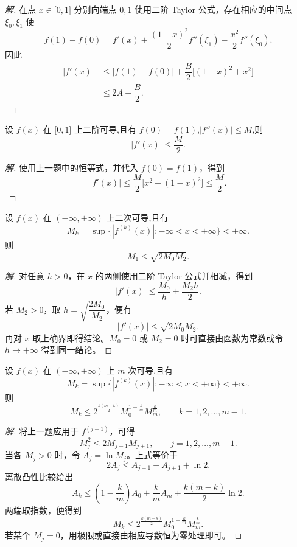 \documentclass[../../数学分析培优讲义(答案版).tex]{subfiles}
\begin{document}
\begin{proof}[解]
在点 $x\in\lbrack0,1\rbrack$ 分别向端点 $0,1$ 使用二阶 Taylor 公式，存在相应的中间点 $\xi_0,\xi_1$ 使
\[
    f(1)-f(0)
    =f'(x)+\dfrac{(1-x)^2}{2}f''(\xi_1)
    -\dfrac{x^2}{2}f''(\xi_0).
\]
因此
\[
\begin{aligned}
    |f'(x)|
    &\leq |f(1)-f(0)|
    +\dfrac{B}{2}\bigl[(1-x)^2+x^2\bigr]\\
    &\leq2A+\dfrac{B}{2}.
\end{aligned}
\]
\end{proof}

\begin{example}
设 $f(x)$ 在 $\lbrack 0,1\rbrack$ 上二阶可导,且有 $f(0)=f(1)$,$|f''(x)|\leq M$,则
\[
    |f'(x)|\leq\dfrac{M}{2}.
\]
\end{example}

\begin{proof}[解]
使用上一题中的恒等式，并代入 $f(0)=f(1)$，得到
\[
    |f'(x)|
    \leq\dfrac{M}{2}\bigl[x^2+(1-x)^2\bigr]
    \leq\dfrac{M}{2}.
\]
\end{proof}

\begin{example}[\markstar]
设 $f(x)$ 在 $(-\infty,+\infty)$ 上二次可导,且有
\[
    M_k=\sup\{|f^{(k)}(x)|:-\infty<x<+\infty\}<+\infty.
\]
则
\[
    M_1\leq\sqrt{2M_0M_2}.
\]
\end{example}

\begin{proof}[解]
对任意 $h>0$，在 $x$ 的两侧使用二阶 Taylor 公式并相减，得到
\[
    |f'(x)|\leq\dfrac{M_0}{h}+\dfrac{M_2h}{2}.
\]
若 $M_2>0$，取 $h=\sqrt{\dfrac{2M_0}{M_2}}$，便有
\[
    |f'(x)|\leq\sqrt{2M_0M_2}.
\]
再对 $x$ 取上确界即得结论。$M_0=0$ 或 $M_2=0$ 时可直接由函数为常数或令 $h\to+\infty$ 得到同一结论。
\end{proof}

\begin{example}[\markstar]
设 $f(x)$ 在 $(-\infty,+\infty)$ 上 $m$ 次可导,且有
\[
    M_k=\sup\{|f^{(k)}(x)|:-\infty<x<+\infty\}<+\infty.
\]
则
\[
    M_k\leq2^{\frac{k(m-k)}{2}}M_0^{1-\frac{k}{m}}M_m^{\frac{k}{m}},
    \qquad k=1,2,\ldots,m-1.
\]
\end{example}

\begin{proof}[解]
将上一题应用于 $f^{(j-1)}$，可得
\[
    M_j^2\leq2M_{j-1}M_{j+1},
    \qquad j=1,2,\ldots,m-1.
\]
当各 $M_j>0$ 时，令 $A_j=\ln M_j$。上式等价于
\[
    2A_j\leq A_{j-1}+A_{j+1}+\ln2.
\]
离散凸性比较给出
\[
    A_k\leq\left(1-\dfrac{k}{m}\right)A_0
    +\dfrac{k}{m}A_m+\dfrac{k(m-k)}{2}\ln2.
\]
两端取指数，便得到
\[
    M_k\leq2^{\frac{k(m-k)}{2}}
    M_0^{1-\frac{k}{m}}M_m^{\frac{k}{m}}.
\]
若某个 $M_j=0$，用极限或直接由相应导数恒为零处理即可。
\end{proof}
\end{document}
